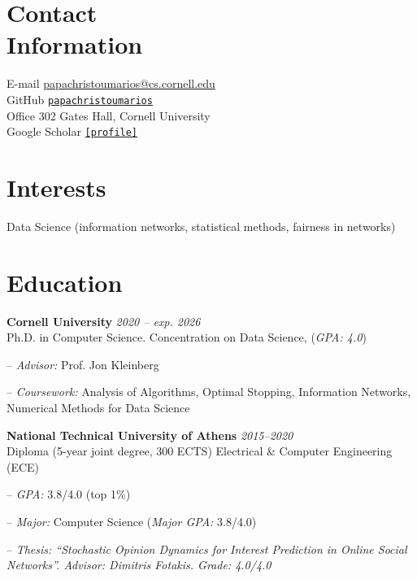 \documentclass[margin, 10pt]{res}
\newcommand{\field}[2]{\noindent \textbf{#1} \hfill #2 \\}
\newcommand{\specialurl}[2]{\href { #2 } {\nolinkurl{[#1]}}}
\begin{document}
\begin{resume}

\section{Contact \\ Information} 
E-mail \hfill \url{papachristoumarios@cs.cornell.edu} \\
GitHub \hfill \href{http://github.com/papachristoumarios}{\nolinkurl{papachristoumarios}} \\
Office \hfill 302 Gates Hall, Cornell University \\
Google Scholar \hfill \specialurl{profile}{https://scholar.google.gr/citations?user=T12JO3MAAAAJ&hl=en}


\section{Interests} Data Science (information networks, statistical methods, fairness in networks)

\section{Education}
\field {Cornell University} {\emph{2020 -- exp. 2026}}
Ph.D. in Computer Science. Concentration on Data Science, (\emph{GPA: 4.0})
\begin{compactitem}
\item[--] \emph{Advisor:} Prof. Jon Kleinberg 
\item[--] \emph{Coursework:} Analysis of Algorithms, Optimal Stopping, Information Networks, Numerical Methods for Data Science
\end{compactitem} 
 
\field{National Technical University of Athens}  {\emph{2015--2020}} 
Diploma (5-year joint degree, 300 ECTS) Electrical \& Computer Engineering (ECE)
\begin{compactitem}
\item[--] \emph{GPA:} 3.8/4.0 (top 1\%)
\item[--] \emph{Major:} Computer Science (\emph{Major GPA:} 3.8/4.0)
\item[--] \emph{Thesis: ``Stochastic Opinion Dynamics for Interest Prediction in Online Social Networks''. Advisor: Dimitris Fotakis. Grade: 4.0/4.0}
\end{compactitem} 



\end{resume}
\end{document}
